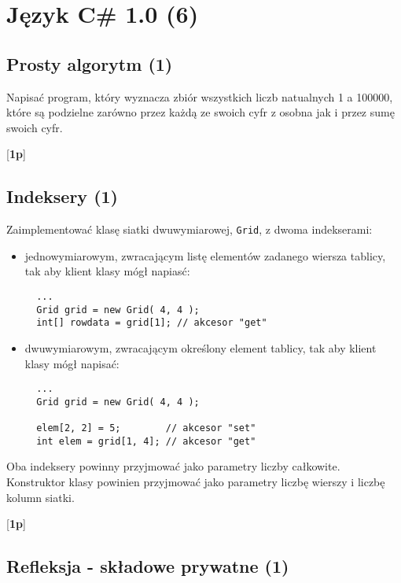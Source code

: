 ﻿\section{Język C\# 1.0 (6)}
  
\subsection{Prosty algorytm (1)}

      Napisać program, który wyznacza zbiór wszystkich liczb natualnych 1 a 100000, które są podzielne zarówno przez każdą ze swoich cyfr z
\label{prosty_algorytm}	  
	  osobna jak i przez sumę swoich cyfr.

      [{\bf 1p}]
 
\subsection{Indeksery (1)}

  Zaimplementować klasę siatki dwuwymiarowej, {\tt Grid}, z dwoma indekserami:
\label{indeksery}  
  
	\begin{itemize}
	\item jednowymiarowym, zwracającym listę elementów zadanego wiersza tablicy, tak aby klient klasy mógł napiasć:

	      \begin{verbatim}
  ...
  Grid grid = new Grid( 4, 4 );
  int[] rowdata = grid[1]; // akcesor "get"
	      \end{verbatim}

	\item dwuwymiarowym, zwracającym określony element tablicy, tak aby klient klasy mógł napisać:
      
	      \begin{verbatim}
  ...
  Grid grid = new Grid( 4, 4 );
		  
  elem[2, 2] = 5;        // akcesor "set"
  int elem = grid[1, 4]; // akcesor "get"
	      \end{verbatim}
	      
	\end{itemize}
      
      Oba indeksery powinny przyjmować jako parametry liczby całkowite. Konstruktor klasy powinien przyjmować
	  jako parametry liczbę wierszy i liczbę kolumn siatki.
      
      [{\bf 1p}]

\subsection{Refleksja - składowe prywatne (1)}

